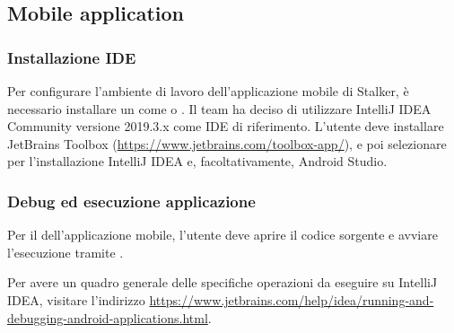 \documentclass[../../manuale-manutentore.tex]{subfiles}
\begin{document}
\subsection{Mobile application}%
\label{sub:mobile_application}

\subsubsection{Installazione IDE}%
\label{subs:installazione_ide}

Per configurare l'ambiente di lavoro dell'applicazione mobile di Stalker, è necessario installare un  come  o .
Il team ha deciso di utilizzare IntelliJ IDEA Community versione 2019.3.x come IDE di riferimento.
L'utente deve installare JetBrains Toolbox (\href{https://www.jetbrains.com/toolbox-app/}{https://www.jetbrains.com/toolbox-app/}), e poi selezionare per l'installazione IntelliJ IDEA e, facoltativamente, Android Studio.

\subsubsection{Debug ed esecuzione applicazione}%
\label{subs:debug_ed_esecuzione_applicazione}

Per il  dell'applicazione mobile, l'utente deve aprire il codice sorgente e avviare l'esecuzione tramite .


Per avere un quadro generale delle specifiche operazioni da eseguire su IntelliJ IDEA, visitare l'indirizzo \href{https://www.jetbrains.com/help/idea/running-and-debugging-android-applications.html}{https://www.jetbrains.com/help/idea/running-and-debugging-android-applications.html}.
\end{document}
